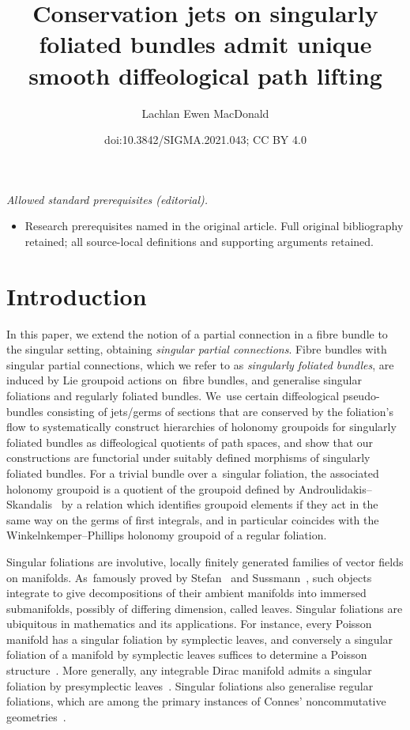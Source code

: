 \documentclass[10pt,a4paper]{amsart}
\title{Conservation jets on singularly foliated bundles admit unique smooth diffeological path lifting}
\author{Lachlan Ewen MacDonald}
\date{doi:10.3842/SIGMA.2021.043; CC BY 4.0}
\numberwithin{equation}{section}
\begin{document}
\maketitle
\noindent\textit{Allowed standard prerequisites (editorial).}\begin{itemize}
\item Research prerequisites named in the original article. Full original bibliography retained; all source-local definitions and supporting arguments retained.
\end{itemize}\medskip
\section{Introduction}

In this paper, we extend the notion of a partial connection in a fibre bundle to the singular setting, obtaining \textit{singular partial connections}. Fibre bundles with singular partial connections, which we refer to as \textit{singularly foliated bundles}, are induced by Lie groupoid actions on~fib\-re bundles, and generalise singular foliations and regularly foliated bundles. We~use certain diffeological pseudo-bundles consisting of jets/germs of sections that are conserved by the foliation's flow to systematically construct hierarchies of holonomy groupoids for singularly foliated bundles as diffeological quotients of path spaces, and show that our constructions are functorial under suitably defined morphisms of singularly foliated bundles. For a trivial bundle over a~singular foliation, the associated holonomy groupoid is a quotient of the groupoid defined by Androulidakis--Skandalis~\cite{iakovos2} by a relation which identifies groupoid elements if they act in the same way on the germs of first integrals, and in particular coincides with the Winkelnkemper--Phillips holonomy groupoid of a regular foliation.

Singular foliations are involutive, locally finitely generated families of vector fields on mani\-folds. As~famously proved by Stefan~\cite{stefan} and Sussmann~\cite{sussmann}, such objects integrate to give decompositions of their ambient manifolds into immersed submanifolds, possibly of differing dimension, called leaves. Singular foliations are ubiquitous in mathematics and its applications. For instance, every Poisson manifold has a singular foliation by symplectic leaves, and conversely a singular foliation of a manifold by symplectic leaves suffices to determine a Poisson structure~\cite{cf1}. More generally, any integrable Dirac manifold admits a singular foliation by presymplectic leaves~\cite{courant}. Singular foliations also generalise regular foliations, which are among the primary instances of Connes' noncommutative geometries~\cite{folops, ncg}.
\end{document}
